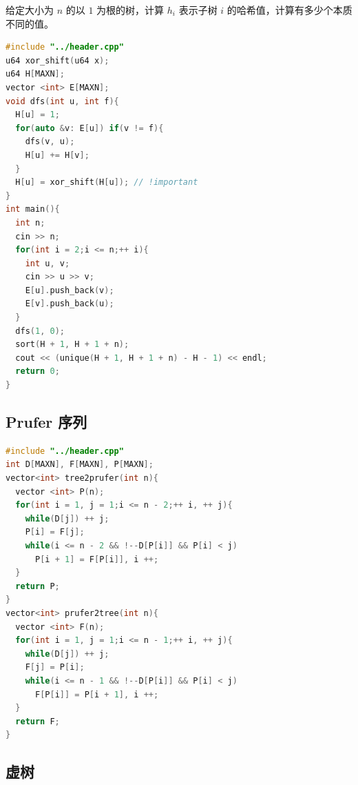 \documentclass[10pt]{ctexart}
\begin{document}
\begin{multicols}{3}
    给定大小为 \(n\) 的以 \(1\) 为根的树，计算 \(h_i\) 表示子树 \(i\)
    的哈希值，计算有多少个本质不同的值。

\begin{lstlisting}[language={C++}]
#include "../header.cpp"
u64 xor_shift(u64 x);
u64 H[MAXN];
vector <int> E[MAXN];
void dfs(int u, int f){
  H[u] = 1;
  for(auto &v: E[u]) if(v != f){
    dfs(v, u);
    H[u] += H[v];
  }
  H[u] = xor_shift(H[u]); // !important
}
int main(){
  int n;
  cin >> n;
  for(int i = 2;i <= n;++ i){
    int u, v;
    cin >> u >> v;
    E[u].push_back(v);
    E[v].push_back(u);
  }
  dfs(1, 0);
  sort(H + 1, H + 1 + n);
  cout << (unique(H + 1, H + 1 + n) - H - 1) << endl;
  return 0;
}
\end{lstlisting}

    \subsection{Prufer 序列}\label{prufer-ux5e8fux5217}

\begin{lstlisting}[language={C++}]
#include "../header.cpp"
int D[MAXN], F[MAXN], P[MAXN];
vector<int> tree2prufer(int n){
  vector <int> P(n);
  for(int i = 1, j = 1;i <= n - 2;++ i, ++ j){
    while(D[j]) ++ j;
    P[i] = F[j];
    while(i <= n - 2 && !--D[P[i]] && P[i] < j)
      P[i + 1] = F[P[i]], i ++;
  }
  return P;
}
vector<int> prufer2tree(int n){
  vector <int> F(n);
  for(int i = 1, j = 1;i <= n - 1;++ i, ++ j){
    while(D[j]) ++ j;
    F[j] = P[i];
    while(i <= n - 1 && !--D[P[i]] && P[i] < j)
      F[P[i]] = P[i + 1], i ++;
  }
  return F;
}
\end{lstlisting}

    \subsection{虚树}\label{ux865aux6811}


\end{multicols}
\end{document}
